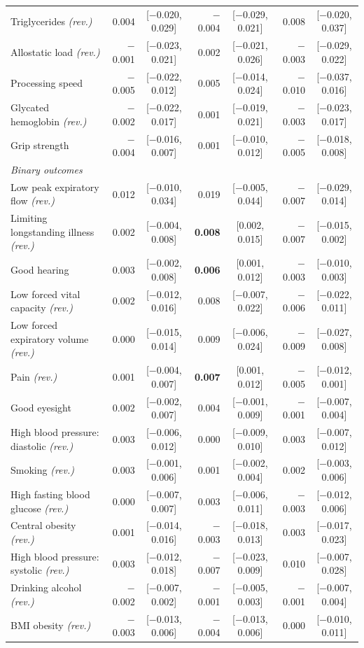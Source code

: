 \begin{longtable}{lrcrcrc}
Triglycerides \textit{(rev.)} & 0.004 & [$-$0.020, 0.029] & $-$0.004 & [$-$0.029, 0.021] & 0.008 & [$-$0.020, 0.037] \\
Allostatic load \textit{(rev.)} & $-$0.001 & [$-$0.023, 0.021] & 0.002 & [$-$0.021, 0.026] & $-$0.003 & [$-$0.029, 0.022] \\
Processing speed & $-$0.005 & [$-$0.022, 0.012] & 0.005 & [$-$0.014, 0.024] & $-$0.010 & [$-$0.037, 0.016] \\
Glycated hemoglobin \textit{(rev.)} & $-$0.002 & [$-$0.022, 0.017] & 0.001 & [$-$0.019, 0.021] & $-$0.003 & [$-$0.023, 0.017] \\
Grip strength & $-$0.004 & [$-$0.016, 0.007] & 0.001 & [$-$0.010, 0.012] & $-$0.005 & [$-$0.018, 0.008] \\
\midrule
\multicolumn{7}{l}{\emph{Binary outcomes}} \\
\midrule
Low peak expiratory flow \textit{(rev.)} & 0.012 & [$-$0.010, 0.034] & 0.019 & [$-$0.005, 0.044] & $-$0.007 & [$-$0.029, 0.014] \\
Limiting longstanding illness \textit{(rev.)} & 0.002 & [$-$0.004, 0.008] & \textbf{0.008} & [0.002, 0.015] & $-$0.007 & [$-$0.015, 0.002] \\
Good hearing & 0.003 & [$-$0.002, 0.008] & \textbf{0.006} & [0.001, 0.012] & $-$0.003 & [$-$0.010, 0.003] \\
Low forced vital capacity \textit{(rev.)} & 0.002 & [$-$0.012, 0.016] & 0.008 & [$-$0.007, 0.022] & $-$0.006 & [$-$0.022, 0.011] \\
Low forced expiratory volume \textit{(rev.)} & 0.000 & [$-$0.015, 0.014] & 0.009 & [$-$0.006, 0.024] & $-$0.009 & [$-$0.027, 0.008] \\
Pain \textit{(rev.)} & 0.001 & [$-$0.004, 0.007] & \textbf{0.007} & [0.001, 0.012] & $-$0.005 & [$-$0.012, 0.001] \\
Good eyesight & 0.002 & [$-$0.002, 0.007] & 0.004 & [$-$0.001, 0.009] & $-$0.001 & [$-$0.007, 0.004] \\
High blood pressure: diastolic \textit{(rev.)} & 0.003 & [$-$0.006, 0.012] & 0.000 & [$-$0.009, 0.010] & 0.003 & [$-$0.007, 0.012] \\
Smoking \textit{(rev.)} & 0.003 & [$-$0.001, 0.006] & 0.001 & [$-$0.002, 0.004] & 0.002 & [$-$0.003, 0.006] \\
High fasting blood glucose \textit{(rev.)} & 0.000 & [$-$0.007, 0.007] & 0.003 & [$-$0.006, 0.011] & $-$0.003 & [$-$0.012, 0.006] \\
Central obesity \textit{(rev.)} & 0.001 & [$-$0.014, 0.016] & $-$0.003 & [$-$0.018, 0.013] & 0.003 & [$-$0.017, 0.023] \\
High blood pressure: systolic \textit{(rev.)} & 0.003 & [$-$0.012, 0.018] & $-$0.007 & [$-$0.023, 0.009] & 0.010 & [$-$0.007, 0.028] \\
Drinking alcohol \textit{(rev.)} & $-$0.002 & [$-$0.007, 0.002] & $-$0.001 & [$-$0.005, 0.003] & $-$0.001 & [$-$0.007, 0.004] \\
BMI obesity \textit{(rev.)} & $-$0.003 & [$-$0.013, 0.006] & $-$0.004 & [$-$0.013, 0.006] & 0.000 & [$-$0.010, 0.011] \\
\end{longtable}
